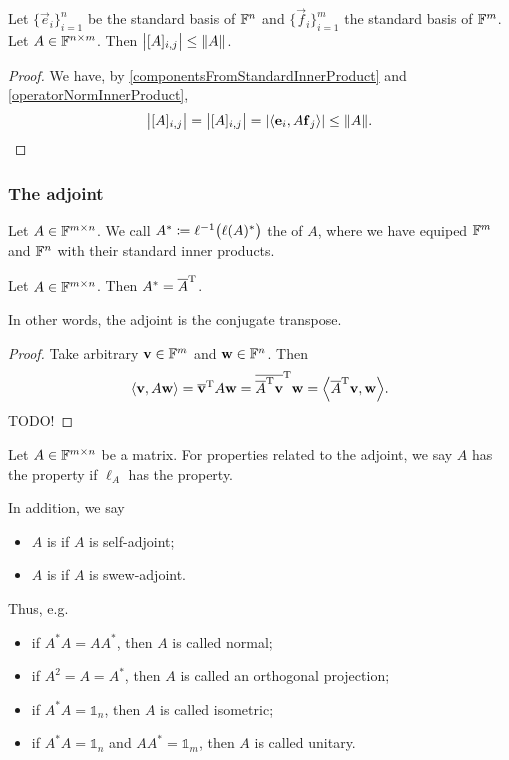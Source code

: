 \begin{lemma} \label{matrixElementsBoundedByNorm}
Let  $\{\vec{e}_i\}_{i=1}^n$ be the standard basis of $\mathbb{F}^n$ and $\{\vec{f}_i\}_{i=1}^m$ the standard basis of $\mathbb{F}^m$. Let $A\in\mathbb{F}^{n\times m}$. Then $\big|[A]_{i,j}\big| \leq \lVert A\rVert$.
\end{lemma}
\begin{proof}
We have, by \ref{componentsFromStandardInnerProduct} and \ref{operatorNormInnerProduct},
\[ \big|[A]_{i,j}\big| = \big|[A]_{i,j}\big| = |\inner{\vec{e}_i, A\vec{f}_j}| \leq \norm{A}. \]
\end{proof}

\subsubsection{The adjoint}
\begin{definition}
Let $A\in \mathbb{F}^{m\times n}$. We call $A^* \coloneqq \ell^{-1}\big(\ell(A)^*\big)$ the  of $A$, where we have equiped $\mathbb{F}^m$ and $\mathbb{F}^n$ with their standard inner products.
\end{definition}

\begin{lemma}
Let $A\in \mathbb{F}^{m\times n}$. Then $A^* = \overline{A}^{\mathrm{T}}$.
\end{lemma}
In other words, the adjoint is the conjugate transpose.
\begin{proof}
Take arbitrary $\boldsymbol{\mathrm{v}}\in\mathbb{F}^m$ and $\boldsymbol{\mathrm{w}}\in\mathbb{F}^n$. Then
\[ \inner{\vec{v}, A\vec{w}} = \overline{\vec{v}}^\transp A\vec{w} = \overline{\overline{A}^\transp\vec{v}}^\transp\vec{w} = \inner{\overline{A}^\transp\vec{v}, \vec{w}}. \]
TODO!
\end{proof}

\begin{definition}
Let $A\in\mathbb{F}^{m\times n}$ be a matrix. For properties related to the adjoint, we say $A$ has the property if $\ell_A$ has the property.

In addition, we say
\begin{itemize}
\item $A$ is  if $A$ is self-adjoint;
\item $A$ is  if $A$ is swew-adjoint.
\end{itemize}
\end{definition}
Thus, e.g.\
\begin{itemize}
\item if $A^*A = AA^*$, then $A$ is called normal;
\item if $A^2 = A = A^*$, then $A$ is called an orthogonal projection;
\item if $A^*A = \mathbb{1}_n$, then $A$ is called isometric;
\item if $A^*A = \mathbb{1}_n$ and $AA^* = \mathbb{1}_m$, then $A$ is called unitary.
\end{itemize}

